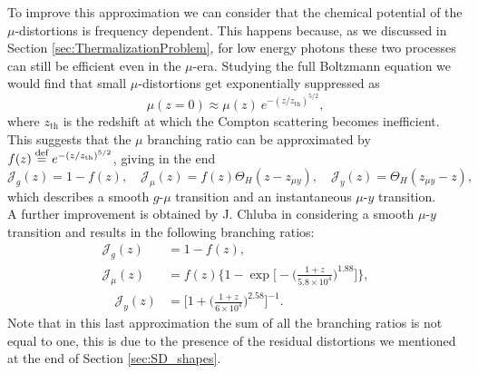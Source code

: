 To improve this approximation we can consider that the chemical potential of the $\mu$-distortions is frequency dependent. This happens because, as we discussed in Section \ref{sec:ThermalizationProblem}, for low energy photons these two processes can still be efficient even in the $\mu$-era. Studying the full Boltzmann equation we would find that small $\mu$-distortions get exponentially suppressed as \cite{Danese_82} 
\begin{equation}
    \label{eq:SD_mu_freq}
    \mu(z=0)\approx\mu(z)\ e^{-(z/z_{\text{th}})^{5/2}},
\end{equation}
where $z_{\text{th}}$ is the redshift at which the Compton scattering becomes inefficient. This suggests that the $\mu$ branching ratio can be approximated by $f(z)\stackrel{\text{def}}{=} e^{-(z/z_{\text{th}})^{5/2}}$, giving in the end
\begin{equation}
    \mathcal{J}_g(z)=1-f(z),\quad \mathcal{J}_\mu(z)=f(z)\Theta_{H}(z-z_{\mu y}),\quad \mathcal{J}_y(z)=\Theta_{H}(z_{\mu y}-z), \label{eq:BR_soft}
\end{equation}
which describes a smooth $g$-$\mu$ transition and an instantaneous $\mu$-$ y$ transition.\\A further improvement is obtained by J. Chluba in \cite{Chluba_Green} considering a smooth $\mu$-$ y$ transition and results in the following branching ratios:
\begin{align}\label{eq:BR_soft_soft}
    \mathcal{J}_g(z)&=1-f(z),\\ \mathcal{J}_\mu(z)&=f(z)\Bigg\{1-\exp\Bigg[-\bigg(\frac{1+z}{5.8\times10^4}\bigg)^{1.88}\Bigg]\Bigg\},\\\quad \mathcal{J}_y(z)&=\Bigg[1+\bigg(\frac{1+z}{6\times10^{4}}\bigg)^{2.58}\Bigg]^{-1}.
\end{align}
Note that in this last approximation the sum of all the branching ratios is not equal to one, this is due to the presence of the residual distortions we mentioned at the end of Section \ref{sec:SD_shapes}. 

